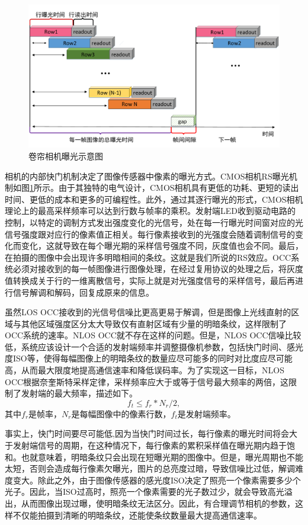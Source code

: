 \begin{figure}[!t]
  \centering
  \includegraphics[width=\linewidth]{FIG/RS.pdf}
  \caption{卷帘相机曝光示意图}
  \label{fig:RS}
\end{figure}
相机的内部快门机制决定了图像传感器中像素的曝光方式。CMOS相机RS曝光机制如图\ref{fig:RS}所示。由于其独特的电气设计，CMOS相机具有更低的功耗、更短的读出时间、更低的成本和更多的可编程性。此外，通过其逐行曝光的形式，CMOS相机理论上的最高采样频率可以达到行数与帧率的乘积。发射端LED收到驱动电路的控制，以特定的调制方式发出强度变化的光信号，处在每一行曝光时间窗对应的光信号强度跟对应行的像素值正相关。每行像素接收到的光强度会随着调制信号的变化而变化，这就导致在每个曝光期的采样信号强度不同，灰度值也会不同。最后，在拍摄的图像中会出现许多明暗相间的条纹。这就是我们所说的RS效应。OCC系统必须对接收到的每一帧图像进行图像处理，在经过复用协议的处理之后，将灰度值转换成关于行的一维离散信号，实际上就是对光强度信号的采样信号，最后再进行信号解调和解码，回复成原来的信息。

虽然LOS OCC接收到的光信号信噪比更高更易于解调，但是图像上光线直射的区域与其他区域强度区分太大导致仅有直射区域有少量的明暗条纹，这样限制了OCC系统的速率。NLOS OCC就不存在这样的问题。但是，NLOS OCC信噪比较低，系统应该设计一个合适的发射端频率并调整摄像机参数，包括快门时间、感光度ISO等，使得每幅图像上的明暗条纹的数量应尽可能多的同时对比度应尽可能高，从而最大限度地提高通信速率和降低误码率。为了实现这一目标，NLOS OCC根据奈奎斯特采样定律，采样频率应大于或等于信号最大频率的两倍，这限制了发射端的最大频率，描述如下。
\begin{equation}\label{eq:Nyquist}
    f_{t} \le f_{r}*N_{r}/2,
  \end{equation}
其中$f_r$是帧率，$N_r$是每幅图像中的像素行数，$f_t$是发射端频率。

事实上，快门时间要尽可能低,因为当快门时间过长，每行像素的曝光时间将会大于发射端信号的周期，在这种情况下，每行像素的累积采样值在曝光期内趋于饱和。也就意味着，明暗条纹只会出现在短曝光期的图像中。但是，曝光周期也不能太短，否则会造成每行像素欠曝光，图片的总亮度过暗，导致信噪比过低，解调难度变大。除此之外，由于图像传感器的感光度ISO决定了照亮一个像素需要多少个光子。因此，当ISO过高时，照亮一个像素需要的光子数过少，就会导致高光溢出，从而图像出现过曝，使明暗条纹无法区分。因此，有合理调节相机的参数，这样不仅能拍摄到清晰的明暗条纹，还能使条纹数量最大提高通信速率。


